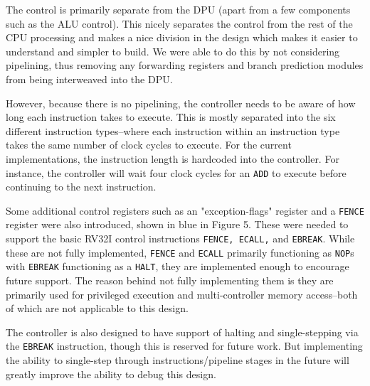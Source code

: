 \documentclass[lettersize,journal]{IEEEtran}
\begin{document}
The control is primarily separate from the DPU (apart from a few components such as the ALU control).
This nicely separates the control from the rest of the CPU processing and makes a nice division in the design which makes it easier to understand and simpler to build.
We were able to do this by not considering pipelining, thus removing any forwarding registers and branch prediction modules from being interweaved into the DPU.

However, because there is no pipelining, the controller needs to be aware of how long each instruction takes to execute.
This is mostly separated into the six different instruction types--where each instruction within an instruction type takes the same number of clock cycles to execute.
For the current implementations, the instruction length is hardcoded into the controller.
For instance, the controller will wait four clock cycles for an \verb|ADD| to execute before continuing to the next instruction.

Some additional control registers such as an "exception-flags" register and a \verb|FENCE| register were also introduced, shown in blue in Figure 5.
These were needed to support the basic RV32I control instructions \verb|FENCE, ECALL,| and \verb|EBREAK|.
While these are not fully implemented, \verb|FENCE| and \verb|ECALL| primarily functioning as \verb|NOP|s with \verb|EBREAK| functioning as a \verb|HALT|, they are implemented enough to encourage future support.
The reason behind not fully implementing them is they are primarily used for privileged execution and multi-controller memory access--both of which are not applicable to this design.

The controller is also designed to have support of halting and single-stepping via the \verb|EBREAK| instruction, though this is reserved for future work.
But implementing the ability to single-step through instructions/pipeline stages in the future will greatly improve the ability to debug this design.
\end{document}

